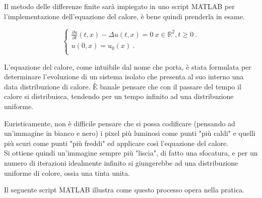 \raggedright

Il metodo delle differenze finite sarà impiegato in uno script MATLAB per l'implementazione dell'equazione del calore, è bene quindi prenderla in esame.

\begin{equation} 
\begin{cases}

\frac{\partial u}{\partial t}(t,x)-\Delta u(t,x) = 0 \ x \in \mathbb R^2, t\ge 0 \ .\\ 

u(0,x) = u_0(x)\ . \\

\end{cases}
\end{equation}

L'equazione del calore, come intuibile dal nome che porta, è stata formulata per determinare l'evoluzione di un sistema isolato che presenta al suo interno una data distribuzione di calore. \`E banale pensare che con il passare del tempo il calore si distribuisca, tendendo per un tempo infinito ad una distribuzione uniforme.

\vspace{1em}

Euristicamente, non è difficile pensare che si possa codificare (pensando ad un'immagine in bianco e nero) i pixel più luminosi come punti "più caldi" e quelli più scuri come punti "più freddi" ed applicare così l'equazione del calore.\\
Si ottiene quindi un'immagine sempre più "liscia", di fatto una sfocatura, e per un numero di iterazioni idealmente infinito si giungerebbe ad una distribuzione uniforme di colore, ossia una tinta unita.

\vspace{1em}

Il seguente script MATLAB illustra come questo processo opera nella pratica.

